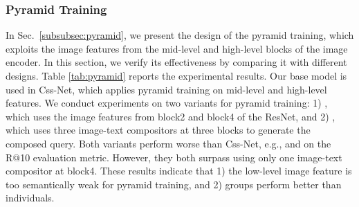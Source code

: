 \documentclass[sigconf]{acmart}
\begin{document}
\begin{table}[ht]
\caption{Quantitative results on the Shoes dataset. The best results are in \textbf{bold}. The symbol  denotes model ensemble method.}
\label{tab:shoes}
\small
\setlength\tabcolsep{18pt}
\end{table}


\subsubsection{Pyramid Training}
\label{subsec:layer2}

In Sec.~\ref{subsubsec:pyramid}, we present the design of the pyramid training, which exploits the image features from the mid-level and high-level blocks of the image encoder. In this section, we verify its effectiveness by comparing it with different designs. Table \ref{tab:pyramid} reports the experimental results. Our base model is  used in Css-Net, which applies pyramid training on mid-level and high-level features. We conduct experiments on two variants for pyramid training: 1) , which uses the image features from block2 and block4 of the ResNet, and 2) , which uses three image-text compositors at three blocks to generate the composed query. Both variants perform worse than Css-Net, e.g.,  and  on the R@10 evaluation metric. However, they both surpass  using only one image-text compositor at block4. These results indicate that 1) the low-level image feature is too semantically weak for pyramid training, and 2) groups perform better than individuals. 
\end{document}
